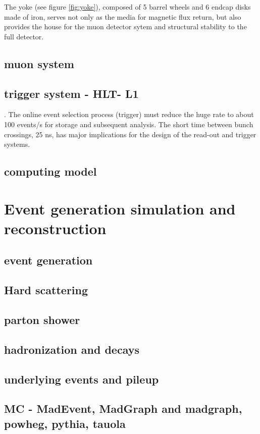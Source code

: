 \noindent The yoke (see figure \ref{fig:yoke}), composed of 5 barrel wheels and 6 endcap disks made of iron, serves not only as the media for magnetic flux return, but also provides the house for the muon detector sytem and structural stability to the full detector.     

\subsection{muon system }
\subsection{trigger system - HLT- L1 }


. The
online event selection process (trigger) must reduce the huge rate to about 100 events/s for storage
and subsequent analysis. The short time between bunch crossings, 25 ns, has major implications
for the design of the read-out and trigger systems.


\subsection{ computing model}
\section{Event generation  simulation and reconstruction}
\subsection{ event generation}
\subsection{Hard scattering  }
\subsection{parton shower }
\subsection{hadronization and decays }
\subsection{underlying events and pileup }
\subsection{ MC - MadEvent, MadGraph and madgraph\@NLO, powheg, pythia, tauola}

